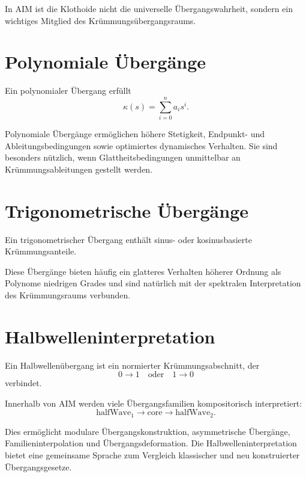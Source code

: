 In AIM ist die Klothoide nicht die universelle Übergangswahrheit, sondern ein
wichtiges Mitglied des Krümmungsübergangsraums.

\section{Polynomiale Übergänge}

\begin{definition}
\label{def:polynomial-transition}
Ein polynomialer Übergang erfüllt
\[
\kappa(s)=\sum_{i=0}^n a_i s^i.
\]
\end{definition}

Polynomiale Übergänge ermöglichen höhere Stetigkeit, Endpunkt- und
Ableitungsbedingungen sowie optimiertes dynamisches Verhalten. Sie sind
besonders nützlich, wenn Glattheitsbedingungen unmittelbar an
Krümmungsableitungen gestellt werden.

\section{Trigonometrische Übergänge}

\begin{definition}
\label{def:trigonometric-transition}
Ein trigonometrischer Übergang enthält sinus- oder kosinusbasierte
Krümmungsanteile.
\end{definition}

Diese Übergänge bieten häufig ein glatteres Verhalten höherer Ordnung als
Polynome niedrigen Grades und sind natürlich mit der spektralen Interpretation
des Krümmungsraums verbunden.

\section{Halbwelleninterpretation}

\begin{definition}[Halbwellenübergang]
\label{def:half-wave-transition}
Ein Halbwellenübergang ist ein normierter Krümmungsabschnitt, der
\[
0\rightarrow1
\quad\text{oder}\quad
1\rightarrow0
\]
verbindet.
\end{definition}

Innerhalb von AIM werden viele Übergangsfamilien kompositorisch interpretiert:
\[
\text{halfWave}_1\rightarrow\text{core}\rightarrow\text{halfWave}_2.
\]

Dies ermöglicht modulare Übergangskonstruktion, asymmetrische Übergänge,
Familieninterpolation und Übergangsdeformation. Die
Halbwelleninterpretation bietet eine gemeinsame Sprache zum Vergleich
klassischer und neu konstruierter Übergangsgesetze.

